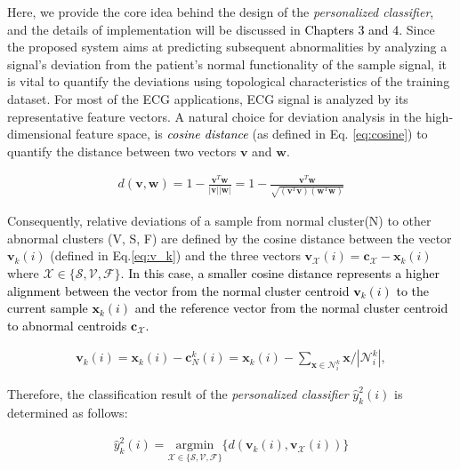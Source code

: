 Here, we provide the core idea behind the design of the \textit{personalized classifier}, and the details of implementation will be discussed in \textcolor{black}{Chapters 3 and 4.} 
Since the proposed system aims at predicting subsequent abnormalities by analyzing a signal's deviation from the patient's normal functionality of the sample signal, it is vital to quantify the deviations using topological characteristics of the training dataset. For most of the ECG applications, ECG signal is analyzed by its representative feature vectors. A natural choice for deviation analysis in the high-dimensional feature space, is \textcolor{black}{\textit{cosine distance}} (as defined in Eq. \ref{eq:cosine}) to quantify the distance between two vectors $\textbf{v}$ and $\textbf{w}$.

\begin{align}
\label{eq:cosine}
d(\mathbf{v},\mathbf{w})= 1 - \frac{\mathbf{v}^T\mathbf{w}}{|\mathbf{v}||\mathbf{w}|}=1 - \frac{\mathbf{v}^T\mathbf{w}}{\sqrt{(\mathbf{v}^T\mathbf{v})(\mathbf{w}^T\mathbf{w})}}
\end{align}

Consequently, relative deviations of a sample from normal cluster(N) to other abnormal clusters (V, S, F) are defined by the cosine distance between the vector $\mathbf{v}_k(i)$ (defined in Eq.\ref{eq:v_k}) and the three vectors $\mathbf{v}_{\mathcal{X}}(i)=\mathbf{c}_{\mathcal{X}}-\mathbf{x}_k(i)$ where $\mathcal{X} \in \{ \mathcal{S}, \mathcal{V}, \mathcal{F}\}$. \textcolor{black}{In this case, a smaller cosine distance represents a higher alignment between the vector from the normal cluster centroid $\mathbf{v}_k(i)$ to the current sample $\mathbf{x}_k(i)$ and the reference vector from the normal cluster centroid to abnormal centroids $\mathbf{c}_{\mathcal{X}}$.}


\begin{align}
\label{eq:v_k}
\mathbf{v}_k(i)=\mathbf{x}_k(i)-\mathbf{c}_N^k(i) = \mathbf{x}_k(i)- {\sum_{\mathbf{x} \in \mathcal{N}_i^k} \mathbf{x}}/{|\mathcal{N}_i^k|}, 
\end{align}

Therefore, the classification result of the \textit{personalized classifier} $\hat{y}^2_k(i)$ is determined as follows:

\begin{align}
\label{eq:personal_discrim}
\hat{y}^2_k(i) = \underset{\mathcal{X} \in \{ \mathcal{S}, \mathcal{V}, \mathcal{F} \}}{\text{argmin}}\{ d(\mathbf{v}_k(i),\mathbf{v}_{\mathcal{X}}(i)) \} 
\end{align}

